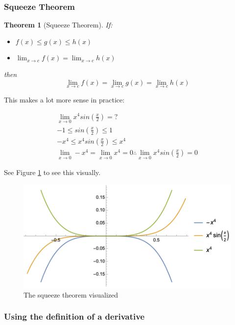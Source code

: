 \documentclass[12pt]{article}
\newtheorem{theorem}{Theorem}
\begin{document}
\subsubsection{Squeeze Theorem}

\begin{theorem}[Squeeze Theorem]
If: 
    \begin{itemize}
        \item $f(x) \leq g(x) \leq h(x)$ 

        \item $\lim_{x \to c} f(x) = \lim_{x \to c} h(x)$

    \end{itemize}
then \[\lim_{x\to c} f(x) = \lim_{x \to c} g(x) = \lim_{x \to c} h(x)\]
\end{theorem}

This makes a lot more sense in practice:

\begin{equation}
    \begin{split}
        \lim_{x\to0} x^4 sin(\frac{x}{2}) = ?\\
        -1 \leq sin(\frac{x}{2}) \leq 1\\
        -x^4 \leq x^4 sin(\frac{x}{2}) \leq x^4\\
        \lim_{x\to 0} -x^4 = \lim_{x\to 0} x^4 = 0 \therefore \lim_{x\to0} x^4 sin(\frac{x}{2}) = 0
    \end{split}
\end{equation}

See Figure \ref{squeeze} to see this visually.

\begin{figure}[!ht]
    \centering
    \includegraphics[width=12.0cm]{misc/squeezetheorem.png}
    \caption{The squeeze theorem visualized}
    \label{squeeze}
\end{figure}

\subsubsection{Using the definition of a derivative}
\end{document}
